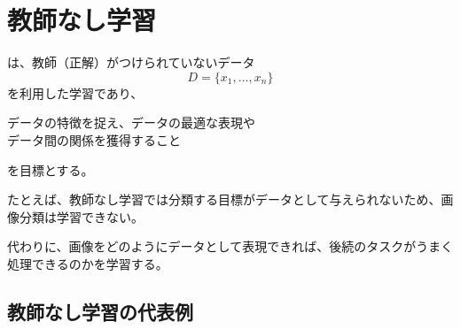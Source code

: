 \documentclass[../../../topic_machine-learning]{subfiles}
\begin{document}
\sectionline
\section{教師なし学習}

は、教師（正解）がつけられていないデータ
\begin{equation*}
  D = \{  x_1, \ldots, x_n \}
\end{equation*}
を利用した学習であり、
\begin{emphabox}
  \begin{spacebox}
    \begin{center}
      データの特徴を捉え、データの最適な表現や\\
      データ間の関係を獲得すること
    \end{center}
  \end{spacebox}
\end{emphabox}
を目標とする。

\br

たとえば、教師なし学習では分類する目標がデータとして与えられないため、画像分類は学習できない。

代わりに、画像をどのようにデータとして表現できれば、後続のタスクがうまく処理できるのかを学習する。

\subsection{教師なし学習の代表例}

\end{document}
